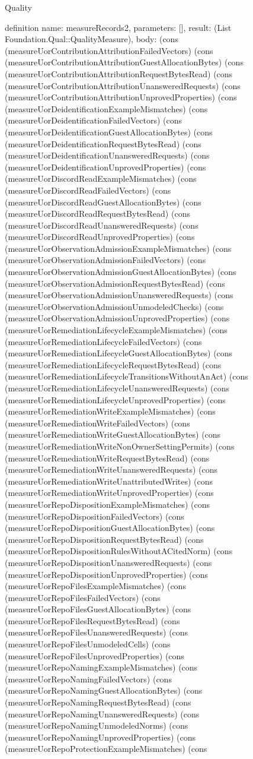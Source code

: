 \begin{lexlean}{Quality}
\begin{semanticmodule}
definition{
  name: measureRecords2,
  parameters: [],
  result: (List Foundation.Qual::QualityMeasure),
  body: (cons (measureUorContributionAttributionFailedVectors) (cons (measureUorContributionAttributionGuestAllocationBytes) (cons (measureUorContributionAttributionRequestBytesRead) (cons (measureUorContributionAttributionUnansweredRequests) (cons (measureUorContributionAttributionUnprovedProperties) (cons (measureUorDeidentificationExampleMismatches) (cons (measureUorDeidentificationFailedVectors) (cons (measureUorDeidentificationGuestAllocationBytes) (cons (measureUorDeidentificationRequestBytesRead) (cons (measureUorDeidentificationUnansweredRequests) (cons (measureUorDeidentificationUnprovedProperties) (cons (measureUorDiscordReadExampleMismatches) (cons (measureUorDiscordReadFailedVectors) (cons (measureUorDiscordReadGuestAllocationBytes) (cons (measureUorDiscordReadRequestBytesRead) (cons (measureUorDiscordReadUnansweredRequests) (cons (measureUorDiscordReadUnprovedProperties) (cons (measureUorObservationAdmissionExampleMismatches) (cons (measureUorObservationAdmissionFailedVectors) (cons (measureUorObservationAdmissionGuestAllocationBytes) (cons (measureUorObservationAdmissionRequestBytesRead) (cons (measureUorObservationAdmissionUnansweredRequests) (cons (measureUorObservationAdmissionUnmodeledChecks) (cons (measureUorObservationAdmissionUnprovedProperties) (cons (measureUorRemediationLifecycleExampleMismatches) (cons (measureUorRemediationLifecycleFailedVectors) (cons (measureUorRemediationLifecycleGuestAllocationBytes) (cons (measureUorRemediationLifecycleRequestBytesRead) (cons (measureUorRemediationLifecycleTransitionsWithoutAnAct) (cons (measureUorRemediationLifecycleUnansweredRequests) (cons (measureUorRemediationLifecycleUnprovedProperties) (cons (measureUorRemediationWriteExampleMismatches) (cons (measureUorRemediationWriteFailedVectors) (cons (measureUorRemediationWriteGuestAllocationBytes) (cons (measureUorRemediationWriteNonOwnerSettingPermits) (cons (measureUorRemediationWriteRequestBytesRead) (cons (measureUorRemediationWriteUnansweredRequests) (cons (measureUorRemediationWriteUnattributedWrites) (cons (measureUorRemediationWriteUnprovedProperties) (cons (measureUorRepoDispositionExampleMismatches) (cons (measureUorRepoDispositionFailedVectors) (cons (measureUorRepoDispositionGuestAllocationBytes) (cons (measureUorRepoDispositionRequestBytesRead) (cons (measureUorRepoDispositionRulesWithoutACitedNorm) (cons (measureUorRepoDispositionUnansweredRequests) (cons (measureUorRepoDispositionUnprovedProperties) (cons (measureUorRepoFilesExampleMismatches) (cons (measureUorRepoFilesFailedVectors) (cons (measureUorRepoFilesGuestAllocationBytes) (cons (measureUorRepoFilesRequestBytesRead) (cons (measureUorRepoFilesUnansweredRequests) (cons (measureUorRepoFilesUnmodeledCells) (cons (measureUorRepoFilesUnprovedProperties) (cons (measureUorRepoNamingExampleMismatches) (cons (measureUorRepoNamingFailedVectors) (cons (measureUorRepoNamingGuestAllocationBytes) (cons (measureUorRepoNamingRequestBytesRead) (cons (measureUorRepoNamingUnansweredRequests) (cons (measureUorRepoNamingUnmodeledNorms) (cons (measureUorRepoNamingUnprovedProperties) (cons (measureUorRepoProtectionExampleMismatches) (cons }
\end{semanticmodule}
\end{lexlean}
